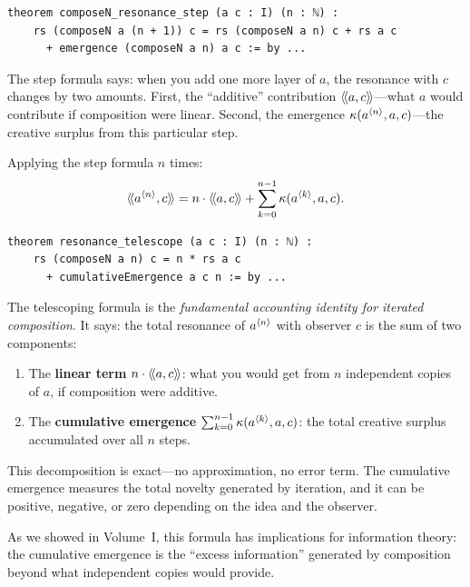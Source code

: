 \begin{lstlisting}[caption={Resonance step (IDT\_v3\_Emergence.lean)}]
theorem composeN_resonance_step (a c : I) (n : ℕ) :
    rs (composeN a (n + 1)) c = rs (composeN a n) c + rs a c
      + emergence (composeN a n) a c := by ...
\end{lstlisting}

The step formula says: when you add one more layer of $a$, the resonance with $c$
changes by two amounts. First, the ``additive'' contribution $\langle\!\langle a, c \rangle\!\rangle$---what
$a$ would contribute if composition were linear. Second, the emergence
$\kappa(a^{\langle n \rangle}, a, c)$---the creative surplus from this particular step.

\begin{theorem}
\label{thm:resonance-telescope}
Applying the step formula $n$ times:
\[
  \langle\!\langle a^{\langle n \rangle}, c \rangle\!\rangle = n \cdot \langle\!\langle a, c \rangle\!\rangle + \sum_{k=0}^{n-1} \kappa(a^{\langle k \rangle}, a, c).
\]
\end{theorem}

\begin{lstlisting}[caption={Resonance telescoping (IDT\_v3\_Emergence.lean)}]
theorem resonance_telescope (a c : I) (n : ℕ) :
    rs (composeN a n) c = n * rs a c
      + cumulativeEmergence a c n := by ...
\end{lstlisting}

\begin{interpretation}
The telescoping formula is the \emph{fundamental accounting identity for iterated
composition}. It says: the total resonance of $a^{\langle n \rangle}$ with observer $c$
is the sum of two components:
\begin{enumerate}
  \item The \textbf{linear term} $n \cdot \langle\!\langle a, c \rangle\!\rangle$: what you would get from $n$
    independent copies of $a$, if composition were additive.
  \item The \textbf{cumulative emergence} $\sum_{k=0}^{n-1} \kappa(a^{\langle k \rangle}, a, c)$:
    the total creative surplus accumulated over all $n$ steps.
\end{enumerate}

This decomposition is exact---no approximation, no error term. The cumulative
emergence measures the total novelty generated by iteration, and it can be
positive, negative, or zero depending on the idea and the observer.

As we showed in Volume~I, this formula has implications for information theory:
the cumulative emergence is the ``excess information'' generated by composition
beyond what independent copies would provide.
\end{interpretation}


